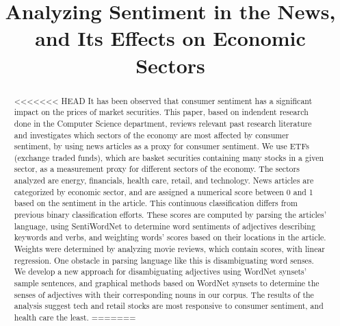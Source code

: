 \documentclass[pageno]{jpaper}
\begin{document}
\title{
Analyzing Sentiment in the News, and Its Effects on Economic Sectors}

\date{}
\maketitle
\doublespacing
\pagestyle{plain}
\setcounter{page}{1}

\begin{abstract}
<<<<<<< HEAD
It has been observed that consumer sentiment has a significant impact on the prices of market securities. This paper, based on indendent research done in the Computer Science department, reviews relevant past research literature and investigates which sectors of the economy are most affected by consumer sentiment, by using news articles as a proxy for consumer sentiment. We use ETFs (exchange traded funds), which are basket securities containing many stocks in a given sector, as a measurement proxy for different sectors of the economy. The sectors analyzed are energy, financials, health care, retail, and technology. News articles are categorized by economic sector, and are assigned a numerical score between 0 and 1 based on the sentiment in the article. This continuous classification differs from previous binary classification efforts. These scores are computed by parsing the articles' language, using SentiWordNet to determine word sentiments of adjectives describing keywords and verbs, and weighting words' scores based on their locations in the article. Weights were determined by analyzing movie reviews, which contain scores, with linear regression. One obstacle in parsing language like this is disambiguating word senses. We develop a new approach for disambiguating adjectives using WordNet synsets' sample sentences, and graphical methods based on WordNet synsets to determine the senses of adjectives with their corresponding nouns in our corpus. The results of the analysis suggest tech and retail stocks are most responsive to consumer sentiment, and health care the least.
=======

\end{abstract}
\end{document}
